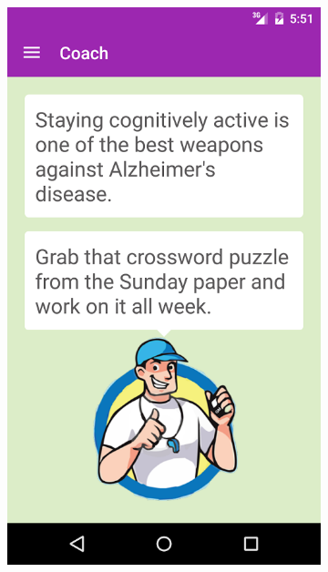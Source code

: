 \begin{figure}[h]
    \centering
    \begin{subfigure}[t]{0.3\textwidth}
        \centering
        \includegraphics[width=\textwidth]{Files/prevention-study-3/figures/gm-new-tips}
        \caption{}
        \label{fig: gm-new-tips}
    \end{subfigure}
    \hfill
    \begin{subfigure}[t]{0.3\textwidth}
        \centering

\end{subfigure}
\end{figure}
